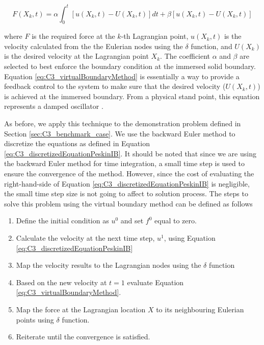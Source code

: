 \begin{equation}\label{eq:C3_virtualBoundaryMethod}
	F(X_k, t) = 
	\alpha \int_0^t \left[ u(X_k, t) - U(X_k, t) \right] dt + 
	\beta \left[ u(X_k, t) - U(X_k, t) \right]
\end{equation}

where $F$ is the required force at the $k$-th Lagrangian point, $u(X_k, t)$ is the velocity calculated from the the Eulerian nodes using the $\delta$ function, and $U(X_k)$ is the desired velocity at the Lagrangian point $X_k$. The coefficient $\alpha$ and $\beta$ are selected to best enforce the boundary condition at the immersed solid boundary. Equation \eqref{eq:C3_virtualBoundaryMethod} is essentially a way to provide a feedback control to the system to make sure that the desired velocity ($U(X_k, t)$) is achieved at the immersed boundary. From a physical stand point, this equation represents a damped oscillator \cite{iaccarino2003immersed}.

As before, we apply this technique to the demonstration problem defined in Section \ref{sec:C3_benchmark_case}. We use the backward Euler method to discretize the equations as defined in Equation \eqref{eq:C3_discretizedEquationPeskinIB}. It should be noted that since we are using the backward Euler method for time integration, a small time step is used to ensure the convergence of the method. However, since the cost of evaluating the right-hand-side of Equation \eqref{eq:C3_discretizedEquationPeskinIB} is negligible, the small time step size is not going to affect to solution process. The steps to solve this problem using the virtual boundary method can be defined as follows

\begin{enumerate}
	\item Define the initial condition as $u^0$ and set $f^0$ equal to zero.
	\item Calculate the velocity at the next time step, $u^1$, using Equation \eqref{eq:C3_discretizedEquationPeskinIB}
	\item Map the velocity results to the Lagrangian nodes using the $\delta$ function
	\item Based on the new velocity at $t=1$ evaluate Equation \eqref{eq:C3_virtualBoundaryMethod}.
	\item Map the force at the Lagrangian location $X$ to its neighbouring Eulerian points using $\delta$ function.
	\item Reiterate until the convergence is satisfied.
\end{enumerate}

